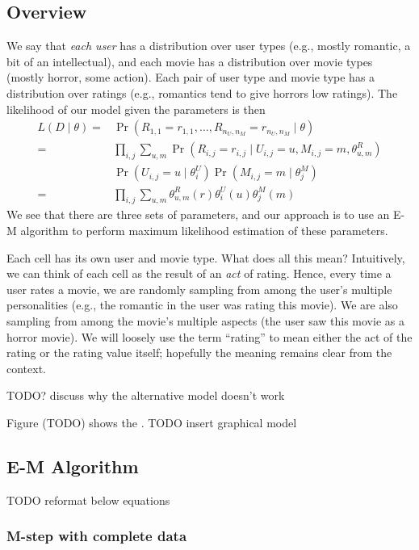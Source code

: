 \documentclass{article}
\newcommand{\LL}   [2]{{ L \left( #1 \mid #2 \right) }}
\newcommand{\PO}   [1]{{ \Pr \left( #1 \right) }}
\newcommand{\PP}   [2]{{ \PO{ #1 \mid #2 } }}
\begin{document}
\subsection{Overview}

We say that {\em each user} has a distribution over user types (e.g.,
mostly romantic, a bit of an intellectual), and each movie has a
distribution over movie types (mostly horror, some action). Each pair
of user type and movie type has a distribution over ratings (e.g.,
romantics tend to give horrors low ratings). The likelihood of
our model given the parameters is then
\begin{align}
  \LL{D}{\theta}
  =& \PP{ R_{1,1} = r_{1,1}, \dots, R_{n_U,n_M} = r_{n_U,n_M} }{
    \theta } \\
  =& \prod_{i,j} \sum_{u,m}
  \PP{ R_{i,j} = r_{i,j} }{ U_{i,j} = u, M_{i,j} = m, \theta^R_{u,m} } \\
  & \PP{ U_{i,j} = u }{ \theta^U_i }
  \PP{ M_{i,j} = m }{ \theta^M_j } \\
  =& \prod_{i,j} \sum_{u,m} \theta^R_{u,m}(r) \theta^U_i(u) \theta^M_j(m)
\end{align}
We see that there are three sets of parameters, and our approach is to
use an E-M algorithm to perform maximum likelihood estimation of these
parameters.

Each cell has its own user and movie type. What does all this mean?
Intuitively, we can think of each cell as the result of an {\em act}
of rating. Hence, every time a user rates a movie, we are randomly
sampling from among the user's multiple personalities (e.g., the
romantic in the user was rating this movie). We are also sampling from
among the movie's multiple aspects (the user saw this movie as a
horror movie). We will loosely use the term ``rating'' to mean either
the act of the rating or the rating value itself; hopefully the
meaning remains clear from the context.

TODO? discuss why the alternative model doesn't work

Figure (TODO) shows the . TODO insert graphical model

\subsection{E-M Algorithm}

TODO reformat below equations

\subsubsection{M-step with complete data}
\end{document}
